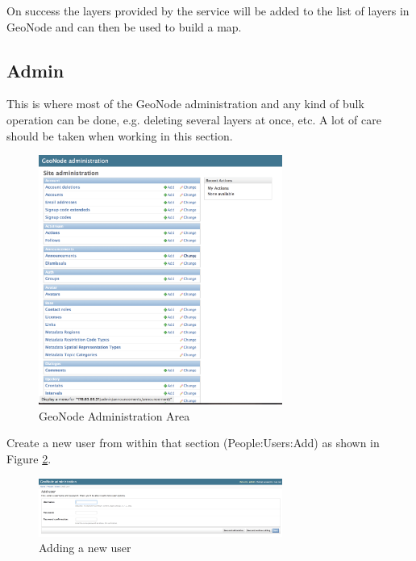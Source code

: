 \documentclass[a4paper,12pt,titlepage]{article}
\begin{document}
On success the layers provided by the service will be added to the list of layers in GeoNode and can then be used to build a map.

\subsection{Admin}

This is where most of the GeoNode administration and any kind of bulk operation can be done, e.g. deleting several layers at once, etc. A lot of care should be taken when working in this section.

\begin{figure}[H]
	\centering
	\includegraphics[width=8cm]{Images/geonode_admin.png}
	\caption{GeoNode Administration Area}\label{fig:geonode_admin}
\end{figure}

Create a new user from within that section (People:Users:Add) as shown in Figure \ref{fig:add_user}.

\begin{figure}[H]
	\centering
	\includegraphics[width=8cm]{Images/add_user.png}
	\caption{Adding a new user}\label{fig:add_user}
\end{figure}
\end{document}
